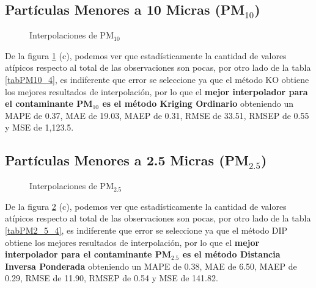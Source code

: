 \subsection{Partículas Menores a 10 Micras (PM$_{10}$)}
\begin{figure}[h]
\centering
{}
\caption{Interpolaciones de PM$_{10}$}
\label{final_5}
\end{figure}

De la figura \ref{final_5} (c), podemos ver que estadísticamente la cantidad de valores atípicos respecto al total de las observaciones son pocas, por otro lado de la tabla \ref{tabPM10_4}, es indiferente que error se seleccione ya que el método KO obtiene los mejores resultados de interpolación, por lo que el \textbf{mejor interpolador para el contaminante PM$_{10}$ es el método Kriging Ordinario} obteniendo un MAPE de 0.37, MAE de 19.03, MAEP de 0.31, RMSE de 33.51, RMSEP de 0.55 y MSE de 1,123.5.

\subsection{Partículas Menores a 2.5 Micras (PM$_{2.5}$)}
\begin{figure}[h]
\centering
{}
\caption{Interpolaciones de PM$_{2.5}$}
\label{final_6}
\end{figure}

De la figura \ref{final_6} (c), podemos ver que estadísticamente la cantidad de valores atípicos respecto al total de las observaciones son pocas, por otro lado de la tabla \ref{tabPM2_5_4}, es indiferente que error se seleccione ya que el método DIP obtiene los mejores resultados de interpolación, por lo que el \textbf{mejor interpolador para el contaminante PM$_{2.5}$ es el método Distancia Inversa Ponderada} obteniendo un MAPE de 0.38, MAE de 6.50, MAEP de 0.29, RMSE de 11.90, RMSEP de 0.54 y MSE de 141.82.

